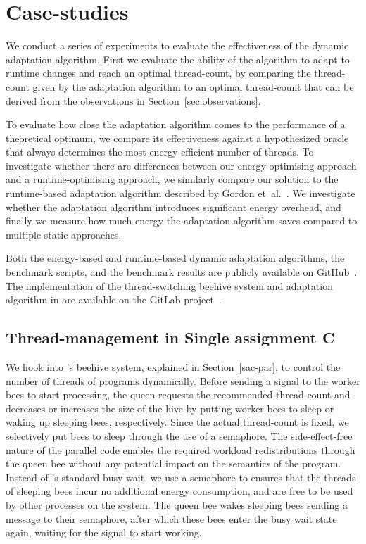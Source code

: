 
\section{Case-studies}\label{sec:evalation}

We conduct a series of experiments to evaluate the effectiveness of the dynamic adaptation
algorithm. First we evaluate the ability of the algorithm to adapt to runtime changes and reach an
optimal thread-count, by comparing the thread-count given by the adaptation algorithm to an optimal
thread-count that can be derived from the observations in Section~\ref{sec:observations}.

To evaluate how close the adaptation algorithm comes to the performance of a theoretical optimum, we
compare its effectiveness against a hypothesized oracle that always determines the most
energy-efficient number of threads. To investigate whether there are differences between our
energy-optimising approach and a runtime-optimising approach, we similarly compare our solution to
the runtime-based adaptation algorithm described by Gordon et~al.~\cite{sac-mtdynamic}. We
investigate whether the adaptation algorithm introduces significant energy overhead, and finally we
measure how much energy the adaptation algorithm saves compared to multiple static approaches.

Both the energy-based and runtime-based dynamic adaptation algorithms, the benchmark scripts, and
the benchmark results are publicly available on GitHub~\cite{repo-mt}. The implementation of the
thread-switching beehive system and adaptation algorithm in \sac{} are available on the \sac{}
GitLab project~\cite{repo-sac}.

\subsection{Thread-management in Single assignment C}\label{sec:implementation-sac}

We hook into \sac{}'s beehive system, explained in Section~\ref{sac-par}, to control the number of
threads of \sac{} programs dynamically. Before sending a signal to the worker bees to start
processing, the queen requests the recommended thread-count and decreases or increases the size of
the hive by putting worker bees to sleep or waking up sleeping bees, respectively. Since the actual
thread-count is fixed, we selectively put bees to sleep through the use of a semaphore. The
side-effect-free nature of the parallel code enables the required workload redistributions through
the queen bee without any potential impact on the semantics of the program. Instead of \sac{}'s
standard busy wait, we use a semaphore to ensures that the threads of sleeping bees incur no
additional energy consumption, and are free to be used by other processes on the system. The queen
bee wakes sleeping bees sending a message to their semaphore, after which these bees enter the busy
wait state again, waiting for the signal to start working.

